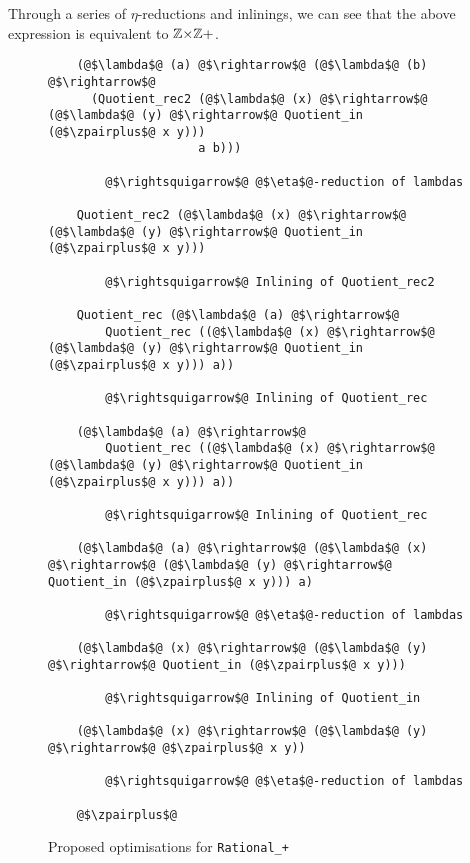 \documentclass[12pt,twoside,maitrise]{dms}
\theoremstyle{definition}
\numberwithin{equation}{section}
\numberwithin{table}{chapter}
\numberwithin{figure}{chapter}
\newcommand\id[1] {\texttt{#1}}
\begin{document}
Through a series of $\eta$-reductions and inlinings, we can see that the above
expression is equivalent to $\mathbb{Z}{\times}\mathbb{Z}+$.

\begin{figure}
\begin{mdframed}
\begin{verbatim}
    (@$\lambda$@ (a) @$\rightarrow$@ (@$\lambda$@ (b) @$\rightarrow$@
      (Quotient_rec2 (@$\lambda$@ (x) @$\rightarrow$@ (@$\lambda$@ (y) @$\rightarrow$@ Quotient_in (@$\zpairplus$@ x y)))
                     a b)))

        @$\rightsquigarrow$@ @$\eta$@-reduction of lambdas

    Quotient_rec2 (@$\lambda$@ (x) @$\rightarrow$@ (@$\lambda$@ (y) @$\rightarrow$@ Quotient_in (@$\zpairplus$@ x y)))

        @$\rightsquigarrow$@ Inlining of Quotient_rec2

    Quotient_rec (@$\lambda$@ (a) @$\rightarrow$@
        Quotient_rec ((@$\lambda$@ (x) @$\rightarrow$@ (@$\lambda$@ (y) @$\rightarrow$@ Quotient_in (@$\zpairplus$@ x y))) a))

        @$\rightsquigarrow$@ Inlining of Quotient_rec

    (@$\lambda$@ (a) @$\rightarrow$@
        Quotient_rec ((@$\lambda$@ (x) @$\rightarrow$@ (@$\lambda$@ (y) @$\rightarrow$@ Quotient_in (@$\zpairplus$@ x y))) a))

        @$\rightsquigarrow$@ Inlining of Quotient_rec

    (@$\lambda$@ (a) @$\rightarrow$@ (@$\lambda$@ (x) @$\rightarrow$@ (@$\lambda$@ (y) @$\rightarrow$@ Quotient_in (@$\zpairplus$@ x y))) a)

        @$\rightsquigarrow$@ @$\eta$@-reduction of lambdas

    (@$\lambda$@ (x) @$\rightarrow$@ (@$\lambda$@ (y) @$\rightarrow$@ Quotient_in (@$\zpairplus$@ x y)))

        @$\rightsquigarrow$@ Inlining of Quotient_in

    (@$\lambda$@ (x) @$\rightarrow$@ (@$\lambda$@ (y) @$\rightarrow$@ @$\zpairplus$@ x y))

        @$\rightsquigarrow$@ @$\eta$@-reduction of lambdas

    @$\zpairplus$@
\end{verbatim}
\end{mdframed}
\caption{Proposed optimisations for \id{Rational\_+}}\label{fig:optim-rational-add}
\end{figure}
\end{document}

